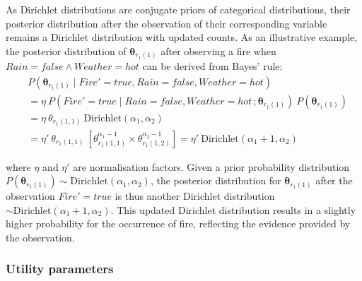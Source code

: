 As Dirichlet distributions are conjugate priors of categorical distributions, their posterior distribution after the observation of their corresponding variable remains a Dirichlet distribution with updated counts. As an illustrative example, the posterior distribution of $\boldsymbol\theta_{r_{1}(1)}$ after observing a fire when $\mathit{Rain}\!=\!\mathit{false} \land \mathit{Weather}\!=\!\mathit{hot}$ can be derived from Bayes' rule: 
\begin{align}
&P(\boldsymbol\theta_{r_{1}(1)} \; | \; \mathit{Fire}'\!=\!\mathit{true}, \mathit{Rain}\!=\!\mathit{false}, \mathit{Weather}\!=\!\mathit{hot}) \nonumber \\
& = \eta \ P(\mathit{Fire}'\!=\!\mathit{true} \; | \; \mathit{Rain}\!=\!\mathit{false}, \mathit{Weather}\!=\!\mathit{hot}\,; \boldsymbol\theta_{r_{1}(1)}) \ P(\boldsymbol\theta_{r_{1}(1)}) \nonumber \\
& = \eta \ \theta_{r_{1}(1,1)} \ \mathrm{Dirichlet}(\alpha_1,\alpha_2) \nonumber \\
& = \eta' \ \theta_{r_{1}(1,1)} \ [ \theta_{r_{1}(1,1)}^{\alpha_1 - 1} \times \theta_{r_{1}(1,2)}^{\alpha_2 - 1} ]   = \eta' \ \textrm{Dirichlet}(\alpha_1+1,\alpha_2) \nonumber 
\end{align}

where $\eta$ and $\eta'$ are normalisation factors.  Given a prior probability distribution $P(\boldsymbol\theta_{r_{1}(1)}) \sim \mathrm{Dirichlet}(\alpha_1, \alpha_2)$, the posterior distribution for $\boldsymbol\theta_{r_{1}(1)}$ after the observation  $\mathit{Fire}'\!=\!\mathit{true}$ is thus another Dirichlet distribution $\sim \mathrm{Dirichlet}(\alpha_1+1,\alpha_2)$.  This updated Dirichlet distribution results in a slightly higher probability for the occurrence of fire, reflecting the evidence provided by the observation. 




\subsubsection*{Utility parameters}

